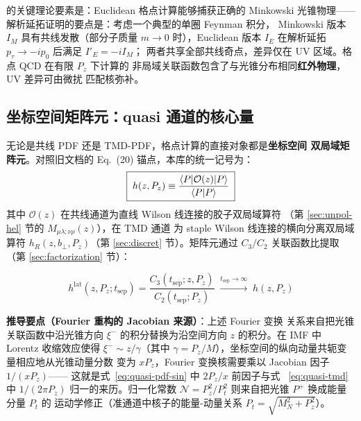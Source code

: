 \documentclass[11pt,a4paper]{ctexart}
\newcommand{\LaMET}{\text{LaMET}}
\newcommand{\bperp}{b_{\perp}}
\begin{document}
\LaMET{} 的关键理论要素是：Euclidean 格点计算能够捕获正确的 Minkowski
光锥物理——解析延拓证明的要点是：考虑一个典型的单圈 Feynman 积分，
Minkowski 版本 $I_M$ 具有共线发散（部分子质量 $m\to0$ 时），Euclidean
版本 $I_E$ 在解析延拓 $p_\tau \to -i p_0$ 后满足 $I'_E = -i I_M$；
两者共享全部共线奇点，差异仅在 UV 区域。格点 QCD 在有限 $P_z$ 下计算的
非局域关联函数包含了与光锥分布相同\textbf{红外物理}，UV 差异可由微扰
匹配核弥补。

\subsection{坐标空间矩阵元：quasi 通道的核心量}

无论是共线 PDF 还是 TMD-PDF，格点计算的直接对象都是\textbf{坐标空间
双局域矩阵元}。对照旧文档的 Eq.~(20) 锚点，本库的统一记号为：
\begin{equation}\label{eq:matrix-element}
\boxed{\;h(z, P_z) \equiv
\frac{\braket{P | \mathcal{O}(z) | P}}{\braket{P|P}}\;}
\end{equation}
其中 $\mathcal{O}(z)$ 在共线通道为直线 Wilson 线连接的胶子双局域算符
（第 \ref{sec:unpol-hel} 节的 $M_{\mu\lambda;\nu\rho}(z)$），在 TMD 通道
为 staple Wilson 线连接的横向分离双局域算符
$h_R(z,\bperp,P_z)$（第 \ref{sec:discret} 节）。矩阵元通过
$C_3/C_2$ 关联函数比提取（第 \ref{sec:factorization} 节）：

\begin{equation}\label{eq:ratio-def}
h^{\text{lat}}(z, P_z; t_{\text{sep}})
= \frac{C_3(t_{\text{sep}}; z, P_z)}{C_2(t_{\text{sep}}; P_z)}
\;\xrightarrow{t_{\text{sep}} \to \infty}\; h(z, P_z)
\end{equation}

\textbf{推导要点（Fourier 重构的 Jacobian 来源）}：上述 Fourier 变换
关系来自把光锥关联函数中沿光锥方向 $\xi^-$ 的积分替换为沿空间方向 $z$
的积分。在 IMF 中 Lorentz 收缩效应使得 $\xi^- \sim z/\gamma$（其中
$\gamma = P_z/M$），坐标空间的纵向动量共轭变量相应地从光锥动量分数
变为 $xP_z$，Fourier 变换核需要乘以 Jacobian 因子 $1/(xP_z)$——
这就是式~\eqref{eq:quasi-pdf-sin} 中 $2P_z/x$ 前因子与式
~\eqref{eq:quasi-tmd} 中 $1/(2\pi P_z)$ 归一的来历。归一化常数
$\mathcal N=P_z^2/P_t^2$ 则来自把光锥 $P^+$ 换成能量分量 $P_t$ 的
运动学修正（准通道中核子的能量-动量关系 $P_t=\sqrt{M_N^2+P_z^2}$）。
\end{document}
